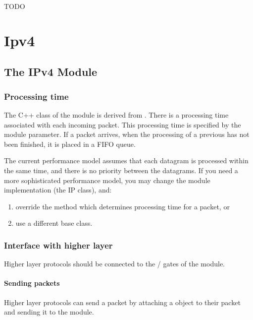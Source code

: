 \ifdraft TODO

\chapter{Ipv4}
\label{cha:ipv4}

\section{The IPv4 Module}

\subsection{Processing time}

The C++ class of the  module is derived from .
There is a processing time associated with each incoming packet.
This processing time is specified by the  module parameter.
If a packet arrives, when the processing of a previous has not been
finished, it is placed in a FIFO queue.

The current performance model assumes that each datagram is processed
within the same time, and there is no priority between the datagrams.
If you need a more sophisticated performance model, you may change
the module implementation (the IP class), and:
\begin{enumerate}
  \item override the  method which determines processing
        time for a packet, or
  \item use a different base class.
\end{enumerate}

\subsection{Interface with higher layer}

Higher layer protocols should be connected to the /
gates of the  module.

\subsubsection*{Sending packets}

Higher layer protocols can send a packet by attaching a 
object to their packet and sending it to the  module.


